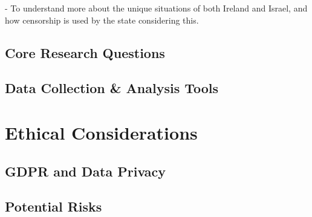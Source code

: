 -   To understand more about the unique situations of both Ireland and Israel, and how 
censorship is used by the state considering this.

\subsection{Core Research Questions}
\subsection{Data Collection \& Analysis Tools}

\section{Ethical Considerations}
\subsection{GDPR and Data Privacy}
\subsection{Potential Risks}